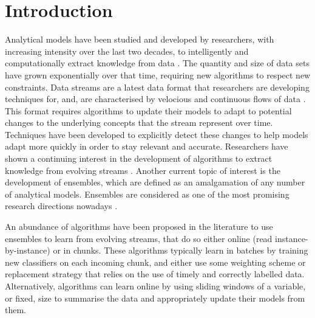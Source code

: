 
\chapter{Introduction\label{chapter:introduction}} %


\newcommand{\keyword}[1]{\textbf{#1}}
\newcommand{\tabhead}[1]{\textbf{#1}}
\newcommand{\code}[1]{\texttt{#1}}
\newcommand{\file}[1]{\texttt{\bfseries#1}}
\newcommand{\option}[1]{\texttt{\itshape#1}}

Analytical models have been studied and developed by researchers, with increasing intensity over the last two decades, to intelligently and computationally extract knowledge from data \cite{bifet2009data}. The quantity and size of data sets have grown exponentially over that time, requiring new algorithms to respect new constraints. Data streams are a latest data format that researchers are developing techniques for, and, are characterised by velocious and continuous flows of data \cite{krempl2014open}. This format requires algorithms to update their models to adapt to potential changes to the underlying concepts that the stream represent over time. Techniques have been developed to explicitly detect these changes to help models adapt more quickly in order to stay relevant and accurate. Researchers have shown a continuing interest in the development of algorithms to extract knowledge from evolving streams \cite{gama2010knowledge, gama2014survey, ghesmoune2016state, KRAWCZYK2017132, krempl2014open, silva2013data, widmer1996learning}. Another current topic of interest is the development of ensembles, which are defined as an amalgamation of any number of analytical models. Ensembles are considered as one of the most promising research directions nowadays \cite{jain2000statistical, KRAWCZYK2017132, oza2008classifier, polikar2006ensemble, rokach2009taxonomy, wozniak2014survey}.

An abundance of algorithms have been proposed in the literature to use ensembles to learn from evolving streams, that do so either online (read instance-by-instance) or in chunks. These algorithms typically learn in batches by training new classifiers on each incoming chunk, and either use some weighting scheme or replacement strategy that relies on the use of timely and correctly labelled data. Alternatively, algorithms can learn online by using sliding windows of a variable, or fixed, size to summarise the data and appropriately update their models from them.

